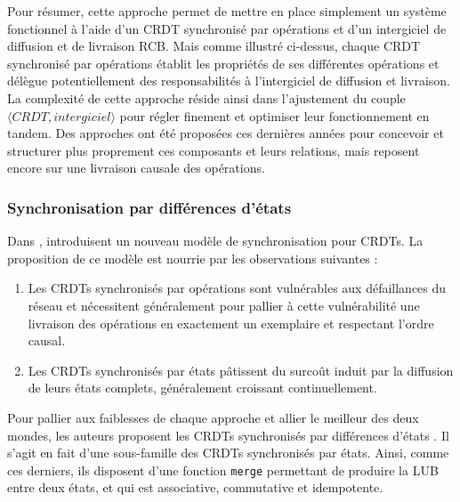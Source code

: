 \documentclass[12pt]{thesul}
\newcommand{\trm}[1]{\mathit{#1}}
\begin{document}
Pour résumer, cette approche permet de mettre en place simplement un système fonctionnel à l'aide d'un \ac{CRDT} synchronisé par opérations et d'un intergiciel de diffusion et de livraison RCB.
Mais comme illustré ci-dessus, chaque \ac{CRDT} synchronisé par opérations établit les propriétés de ses différentes opérations et délègue potentiellement des responsabilités à l'intergiciel de diffusion et livraison.
La complexité de cette approche réside ainsi dans l'ajustement du couple $\langle \trm{CRDT}, \trm{intergiciel} \rangle$ pour régler finement et optimiser leur fonctionnement en tandem.
Des approches \cite{baquero2017pure, 2021-improving-reactivity-pure-op-based-crdts-bauwens} ont été proposées ces dernières années pour concevoir et structurer plus proprement ces composants et leurs relations, mais reposent encore sur une livraison causale des opérations.

\subsubsection{Synchronisation par différences d'états}

Dans \cite{almeida2015delta}, \citeauthor{almeida2015delta} introduisent un nouveau modèle de synchronisation pour \acp{CRDT}.
La proposition de ce modèle est nourrie par les observations suivantes :
\begin{enumerate}[label=(\roman*)]
  \item Les \acp{CRDT} synchronisés par opérations sont vulnérables aux défaillances du réseau et nécessitent généralement pour pallier à cette vulnérabilité une livraison des opérations en exactement un exemplaire et respectant l'ordre causal.
  \item Les \acp{CRDT} synchronisés par états pâtissent du surcoût induit par la diffusion de leurs états complets, généralement croissant continuellement.
\end{enumerate}

Pour pallier aux faiblesses de chaque approche et allier le meilleur des deux mondes, les auteurs proposent les \acp{CRDT} synchronisés par différences d'états \cite{almeida2015delta,Almeida_2018, enes2019}.
Il s'agit en fait d'une sous-famille des \acp{CRDT} synchronisés par états.
Ainsi, comme ces derniers, ils disposent d'une fonction \texttt{merge} permettant de produire la LUB entre deux états, et qui est associative, commutative et idempotente.
\end{document}
